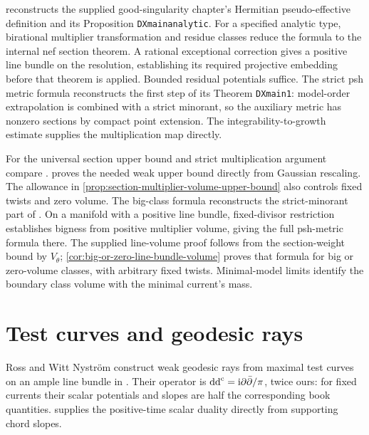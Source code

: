  reconstructs the supplied good-singularity chapter's Hermitian pseudo-effective definition and its Proposition \texttt{DXmainanalytic}. For a specified analytic type, birational multiplier transformation and residue classes reduce the formula to the internal nef section theorem. A rational exceptional correction gives a positive line bundle on the resolution, establishing its required projective embedding before that theorem is applied. Bounded residual potentials suffice. The strict psh metric formula reconstructs the first step of its Theorem \texttt{DXmain1}: model-order extrapolation is combined with a strict minorant, so the auxiliary metric has nonzero sections by compact point extension. The integrability-to-growth estimate supplies the multiplication map directly.

For the universal section upper bound and strict multiplication argument compare \cite[Proposition 4.1, pp.~1972--1973; Proposition 4.3 and Lemmas 4.4--4.5, pp.~1974--1975]{DX21}.  proves the needed weak upper bound directly from Gaussian rescaling. The allowance in \cref{prop:section-multiplier-volume-upper-bound} also controls fixed twists and zero volume. The big-class formula reconstructs the strict-minorant part of \cite[Theorem 4.6, p.~1976]{DX21}. On a manifold with a positive line bundle, fixed-divisor restriction establishes bigness from positive multiplier volume, giving the full psh-metric formula there. The supplied line-volume proof follows from the section-weight bound by $V_\theta$; \cref{cor:big-or-zero-line-bundle-volume} proves that formula for big or zero-volume classes, with arbitrary fixed twists. Minimal-model limits identify the boundary class volume with the minimal current's mass.

\section{Test curves and geodesic rays}\label{sec:history-test-curves}
Ross and Witt Nystr\"om construct weak geodesic rays from maximal test curves on an ample line bundle in \cite[Lemma 6.2 and Theorem 6.8, pp.~149--152]{RWN14}. Their operator is $\mathrm{dd}^{\mathrm{c}}=\mathrm i\partial\bar\partial/\pi$, twice ours: for fixed currents their scalar potentials and slopes are half the corresponding book quantities.  supplies the positive-time scalar duality directly from supporting chord slopes.

